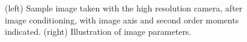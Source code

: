 \begin{figure}[t]
\centerline{}
\caption{\label{FIG::ANALYSIS::PARAM} (left) Sample image 
taken with the high resolution camera, after image conditioning, with 
image axis and second order moments indicated. (right) Illustration 
of image parameters.}
\end{figure}


